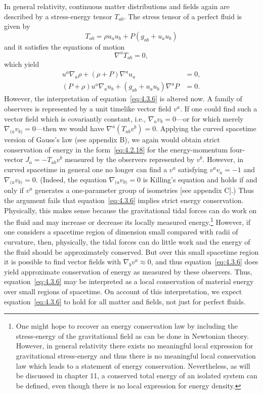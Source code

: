 In general relativity, continuous matter distributions and fields again are described
by a stress-energy tensor \(T_{ab}\). The stress tensor of a perfect fluid is given
by
\begin{equation}
  T_{ab}=\rho u_au_b+P(g_{ab}+u_au_b)
  \tag{4.3.5}\label{eq:4.3.5}
\end{equation}
and it satisfies the equations of motion
\begin{equation}
  \nabla^aT_{ab}=0 ,
  \tag{4.3.6}\label{eq:4.3.6}
\end{equation}
which yield
\begin{align}
  u^a\nabla_a\rho+(\rho+P)\nabla^au_a&=0 ,
    \tag{4.3.7}\label{eq:4.3.7}\\
  (P+\rho)u^a\nabla_au_b+(g_{ab}+u_au_b)\nabla^aP&=0 .
    \tag{4.3.8}\label{eq:4.3.8}
\end{align}
However, the interpretation of equation~\eqref{eq:4.3.6} is altered now. A
family of observers is represented by a unit timelike vector field \(v^a\). If
one could find such a vector field which is covariantly constant, i.e.,
\(\nabla_av_b=0\)---or for which merely \(\nabla_{(a}v_{b)}=0\)---then we
would have \(\nabla^a(T_{ab}v^b)=0\). Applying the curved spacetime version
of Gauss's law (see appendix B), we again would obtain strict conservation of
energy in the form~\eqref{eq:4.2.18} for the energy-momentum four-vector
\(J_a=-T_{ab}v^b\) measured by the observers represented by \(v^b\).
However, in curved spacetime in general one no longer can find a \(v^a\)
satisfying \(v^av_a=-1\) and \(\nabla_{(a}v_{b)}=0\). (Indeed, the
equation \(\nabla_{(a}v_{b)}=0\) is Killing's equation and holds if and only
if \(v^a\) generates a one-parameter group of isometries [see appendix C].)
Thus the argument fails that equation~\eqref{eq:4.3.6} implies strict energy
conservation. Physically, this makes sense because the gravitational tidal forces
can do work on the fluid and may increase or decrease its locally measured
energy.\footnote{One might hope to recover an energy conservation law by including
the stress-energy of the gravitational field as can be done in Newtonian theory.
However, in general relativity there exists no meaningful local expression for
gravitational stress-energy and thus there is no meaningful local conservation law
which leads to a statement of energy conservation. Nevertheless, as will be
discussed in chapter 11, a conserved total energy of an isolated system can be
defined, even though there is no local expression for energy density.} However, if
one considers a spacetime region of dimension small compared with radii of
curvature, then, physically, the tidal forces can do little work and the energy of
the fluid should be approximately conserved. But over this small spacetime region
it is possible to find vector fields with \(\nabla_bv^a\approx0\), and thus
equation~\eqref{eq:4.3.6} does yield approximate conservation of energy as
measured by these observers. Thus, equation~\eqref{eq:4.3.6} may be
interpreted as a local conservation of material energy over small regions of
spacetime. On account of this interpretation, we expect
equation~\eqref{eq:4.3.6} to hold for all matter and fields, not just for perfect
fluids.


